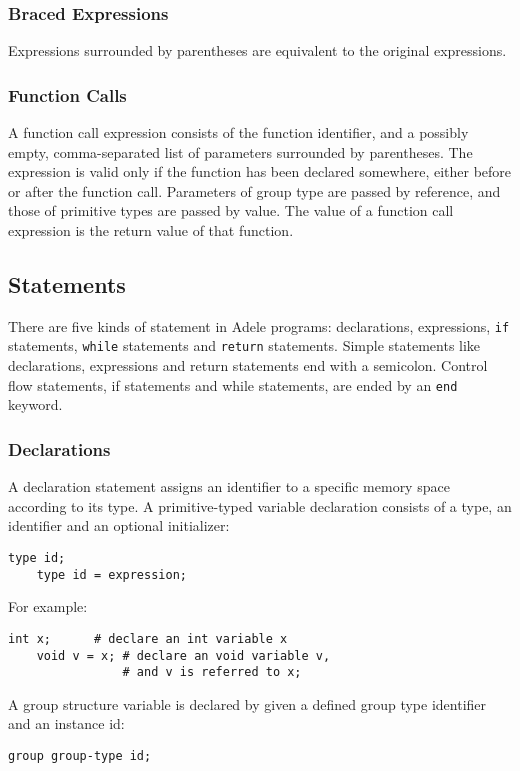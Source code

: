 \documentclass[11pt,letterpaper]{article}
\begin{document}
\subsubsection {Braced Expressions}
Expressions surrounded by parentheses are equivalent to the original expressions.

\subsubsection {Function Calls}
A function call expression consists of the function identifier, and a possibly empty, comma-separated list of parameters surrounded by parentheses. The expression is valid only if the function has been declared somewhere, either before or after the function call. Parameters of group type are passed by reference, and those of primitive types are passed by value. The value of a function call expression is the return value of that function.

\subsection {Statements}
There are five kinds of statement in Adele programs: declarations, expressions, \texttt{if} statements, \texttt{while} statements and \texttt{return} statements. Simple statements like declarations, expressions and return statements end with a semicolon. Control flow statements, if statements and while statements, are ended by an \texttt{end} keyword.

\subsubsection {Declarations}
A declaration statement assigns an identifier to a specific memory space according to its type. A primitive-typed variable declaration consists of a type, an identifier and an optional initializer:
\begin{lstlisting}[tabsize=4]
	type id;
	type id = expression;
\end{lstlisting}

For example:
\begin{lstlisting}[tabsize=4]
	int x; 		# declare an int variable x
	void v = x; # declare an void variable v, 
                # and v is referred to x;
\end{lstlisting}

A group structure variable is declared by given a defined group type identifier and an instance id:
\begin{lstlisting}[tabsize=4]
	group group-type id;
\end{lstlisting}
\end{document}
